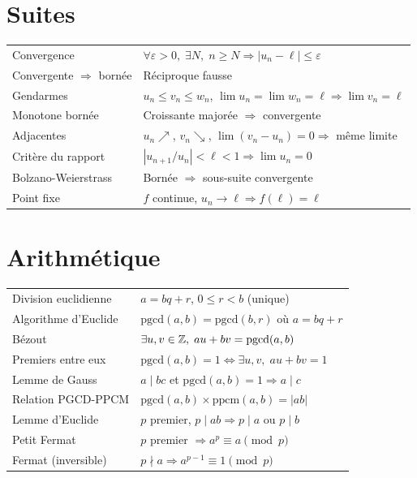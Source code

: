 \section{Suites}

\begin{center}
\renewcommand{\arraystretch}{1.4}
\begin{tabular}{|l|l|}
\hline
Convergence & $\forall \varepsilon > 0,\; \exists N,\; n \geqslant N \Rightarrow |u_n - \ell| \leqslant \varepsilon$ \\
Convergente $\Rightarrow$ bornée & Réciproque fausse \\
Gendarmes & $u_n \leqslant v_n \leqslant w_n$, $\lim u_n = \lim w_n = \ell \Rightarrow \lim v_n = \ell$ \\
Monotone bornée & Croissante majorée $\Rightarrow$ convergente \\
Adjacentes & $u_n \nearrow$, $v_n \searrow$, $\lim(v_n - u_n) = 0 \Rightarrow$ même limite \\
Critère du rapport & $|u_{n+1}/u_n| < \ell < 1 \Rightarrow \lim u_n = 0$ \\
Bolzano-Weierstrass & Bornée $\Rightarrow$ sous-suite convergente \\
Point fixe & $f$ continue, $u_n \to \ell \Rightarrow f(\ell) = \ell$ \\
\hline
\end{tabular}
\end{center}

\section{Arithmétique}

\begin{center}
\renewcommand{\arraystretch}{1.4}
\begin{tabular}{|l|l|}
\hline
Division euclidienne & $a = bq + r$, \; $0 \leqslant r < b$ (unique) \\
Algorithme d'Euclide & $\text{pgcd}(a,b) = \text{pgcd}(b, r)$ où $a = bq + r$ \\
Bézout & $\exists u,v \in \mathbb{Z},\; au + bv = \text{pgcd}(a,b)$ \\
Premiers entre eux & $\text{pgcd}(a,b) = 1 \Leftrightarrow \exists u,v,\; au+bv=1$ \\
Lemme de Gauss & $a \mid bc$ et $\text{pgcd}(a,b)=1 \Rightarrow a \mid c$ \\
Relation PGCD-PPCM & $\text{pgcd}(a,b) \times \text{ppcm}(a,b) = |ab|$ \\
Lemme d'Euclide & $p$ premier, $p \mid ab \Rightarrow p \mid a$ ou $p \mid b$ \\
Petit Fermat & $p$ premier $\Rightarrow a^p \equiv a \pmod{p}$ \\
Fermat (inversible) & $p \nmid a \Rightarrow a^{p-1} \equiv 1 \pmod{p}$ \\
\hline
\end{tabular}
\end{center}

